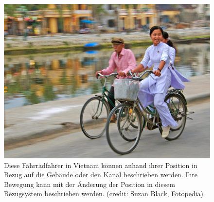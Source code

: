 \documentclass[
]{book}
\begin{document}
\begin{figure}
\hypertarget{import-auto-id2723149}{%
\centering
\includegraphics{images/Figure_02_01_00.jpg}
\caption{Diese Fahrradfahrer in Vietnam können anhand ihrer Position in Bezug auf die Gebäude oder den Kanal beschrieben werden. Ihre Bewegung kann mit der Änderung der Position in diesem Bezugsystem beschrieben werden. (credit: Suzan
Black, Fotopedia)}\label{import-auto-id2723149}
}
\end{figure}
\end{document}
